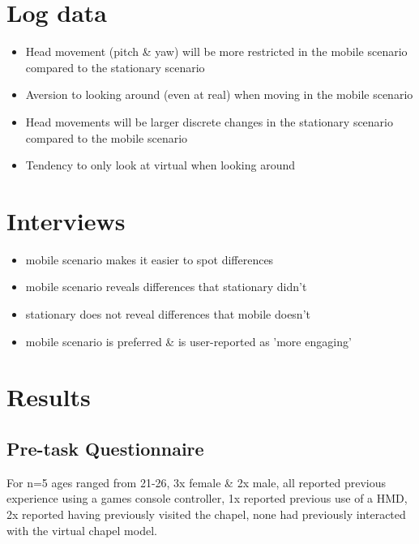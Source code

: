 \section{Log data}
\begin{itemize}
	\item Head movement (pitch \& yaw) will be more restricted in the mobile scenario compared to the stationary scenario
	\item Aversion to looking around (even at real) when moving in the mobile scenario
	\item Head movements will be larger discrete changes in the stationary scenario compared to the mobile scenario
	\item Tendency to only look at virtual when looking around
\end{itemize}

\section{Interviews}
\begin{itemize}
	\item mobile scenario makes it easier to spot differences
	\item mobile scenario reveals differences that stationary didn't
	\item stationary does not reveal differences that mobile doesn't
	\item mobile scenario is preferred \& is user-reported as 'more engaging'
\end{itemize}


\section{Results}

\subsection{Pre-task Questionnaire}

For n=5 ages ranged from 21-26, 3x female \& 2x male, all reported previous experience using a games console controller, 1x reported previous use of a HMD, 2x reported having previously visited the chapel, none had previously interacted with the virtual chapel model.



